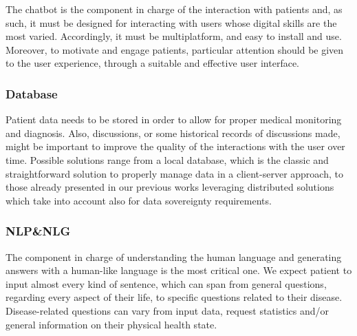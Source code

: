 \documentclass[preprint,12pt]{elsarticle}
\begin{document}
The chatbot is the component in charge of the interaction with patients and, as such, it must be designed for interacting with users whose digital skills are the most varied. Accordingly, it must be multiplatform, and easy to install and use.
%
Moreover, to motivate and engage patients, particular attention should be given to the user experience, through a suitable and effective user interface.

\subsubsection{Database}
Patient data needs to be stored in order to allow for proper medical monitoring and diagnosis. 
Also, discussions, or some historical records of discussions made, might be important to improve the quality of the interactions with the user over time. 
Possible solutions range from a local database, which is the classic and straightforward solution to properly manage data in a client-server approach, to those already presented in our previous works \cite{MontagnaGoodIT2023} leveraging distributed solutions which take into account also for data sovereignty requirements.

\subsubsection{NLP\&NLG}\label{subsubsec-nlp}

The component in charge of understanding the human language and generating answers with a human-like language is the most critical one.
%
We expect patient to input almost every kind of sentence, which can span from general questions, regarding every aspect of their life, to specific questions related to their disease. 
%
Disease-related questions can vary from input data, request statistics and/or general information on their physical health state.
\end{document}
